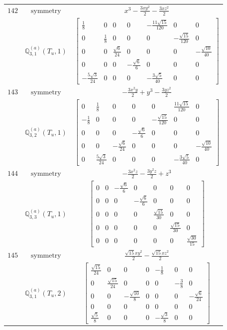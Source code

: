 \documentclass[fleqn,8pt,landscape]{jsarticle}
\begin{document}
\begin{longtable}{ccc}
$ 142 $ & $ \text{symmetry} $ & $ x^{3} - \frac{3 x y^{2}}{2} - \frac{3 x z^{2}}{2} $ \\
$  $ & $ \mathbb{Q}_{3,1}^{(a)}(T_{u},1) $ & $ \begin{bmatrix} \frac{1}{8} & 0 & 0 & 0 & - \frac{11 \sqrt{15}}{120} & 0 & 0 \\ 0 & \frac{1}{8} & 0 & 0 & 0 & - \frac{\sqrt{15}}{120} & 0 \\ 0 & 0 & \frac{\sqrt{6}}{24} & 0 & 0 & 0 & - \frac{\sqrt{10}}{40} \\ 0 & 0 & 0 & - \frac{\sqrt{6}}{6} & 0 & 0 & 0 \\ - \frac{5 \sqrt{3}}{24} & 0 & 0 & 0 & - \frac{3 \sqrt{5}}{40} & 0 & 0 \end{bmatrix} $ \\ \hline
$ 143 $ & $ \text{symmetry} $ & $ - \frac{3 x^{2} y}{2} + y^{3} - \frac{3 y z^{2}}{2} $ \\
$  $ & $ \mathbb{Q}_{3,2}^{(a)}(T_{u},1) $ & $ \begin{bmatrix} 0 & \frac{1}{8} & 0 & 0 & 0 & \frac{11 \sqrt{15}}{120} & 0 \\ - \frac{1}{8} & 0 & 0 & 0 & - \frac{\sqrt{15}}{120} & 0 & 0 \\ 0 & 0 & 0 & - \frac{\sqrt{6}}{6} & 0 & 0 & 0 \\ 0 & 0 & - \frac{\sqrt{6}}{24} & 0 & 0 & 0 & - \frac{\sqrt{10}}{40} \\ 0 & \frac{5 \sqrt{3}}{24} & 0 & 0 & 0 & - \frac{3 \sqrt{5}}{40} & 0 \end{bmatrix} $ \\ \hline
$ 144 $ & $ \text{symmetry} $ & $ - \frac{3 x^{2} z}{2} - \frac{3 y^{2} z}{2} + z^{3} $ \\
$  $ & $ \mathbb{Q}_{3,3}^{(a)}(T_{u},1) $ & $ \begin{bmatrix} 0 & 0 & - \frac{\sqrt{6}}{6} & 0 & 0 & 0 & 0 \\ 0 & 0 & 0 & - \frac{\sqrt{6}}{6} & 0 & 0 & 0 \\ 0 & 0 & 0 & 0 & \frac{\sqrt{15}}{30} & 0 & 0 \\ 0 & 0 & 0 & 0 & 0 & \frac{\sqrt{15}}{30} & 0 \\ 0 & 0 & 0 & 0 & 0 & 0 & \frac{\sqrt{30}}{15} \end{bmatrix} $ \\ \hline
$ 145 $ & $ \text{symmetry} $ & $ \frac{\sqrt{15} x y^{2}}{2} - \frac{\sqrt{15} x z^{2}}{2} $ \\
$  $ & $ \mathbb{Q}_{3,1}^{(a)}(T_{u},2) $ & $ \begin{bmatrix} \frac{\sqrt{15}}{24} & 0 & 0 & 0 & - \frac{1}{8} & 0 & 0 \\ 0 & \frac{\sqrt{15}}{24} & 0 & 0 & 0 & - \frac{3}{8} & 0 \\ 0 & 0 & - \frac{\sqrt{10}}{8} & 0 & 0 & 0 & - \frac{\sqrt{6}}{24} \\ 0 & 0 & 0 & 0 & 0 & 0 & 0 \\ \frac{\sqrt{5}}{8} & 0 & 0 & 0 & - \frac{\sqrt{3}}{8} & 0 & 0 \end{bmatrix} $ \\ \hline

\end{longtable}
\end{document}
